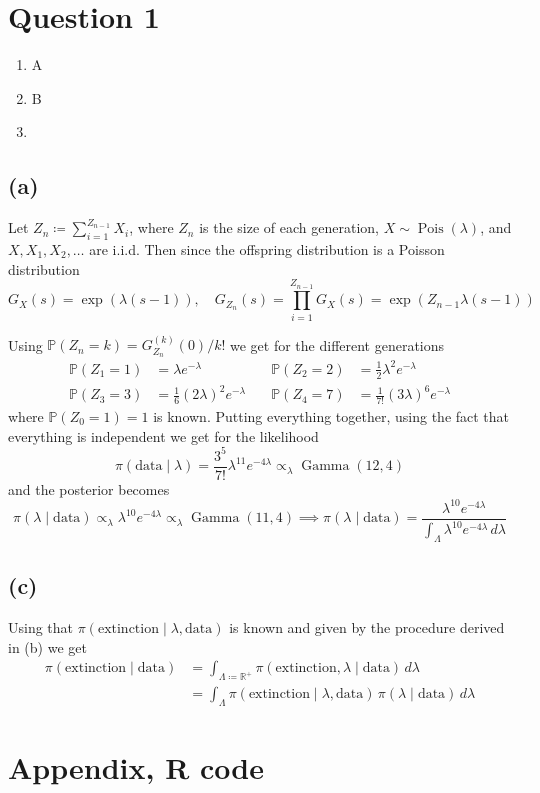 \documentclass{article}
\DeclareMathOperator\Poisson{Pois}
\DeclareMathOperator\GammaDist{Gamma}
\begin{document}
\section{Question 1}
\begin{enumerate}[label=(\alph*)]
\item A
\item B
\item
\end{enumerate}

\subsection{(a)}
Let $Z_n \coloneqq \sum_{i=1}^{Z_{n-1}} X_i$,
where $Z_n$ is the size of each generation,
$X \sim \Poisson(\lambda)$, and $X, X_1, X_2, \ldots$ are i.i.d.
Then since the offspring distribution is a Poisson distribution
$$ G_X(s) = \exp(\lambda (s - 1)), \quad
G_{Z_n}(s) = \prod_{i=1}^{Z_{n-1}} G_X(s) = \exp(Z_{n-1} \lambda (s - 1)) $$

Using $ \mathbb P(Z_n = k) = G_{Z_n}^{(k)}(0) / k! $
we get for the different generations
\begin{align*}
	\mathbb P(Z_1 = 1) &= \lambda e^{-\lambda} &\quad
	\mathbb P(Z_2 = 2) &= \frac12 \lambda^2 e^{-\lambda} \\
	\mathbb P(Z_3 = 3) &= \frac16 (2\lambda)^2 e^{-\lambda} &\quad
	\mathbb P(Z_4 = 7) &= \frac1{7!} (3\lambda)^6 e^{-\lambda}
\end{align*}
where $\mathbb P(Z_0 = 1) = 1$ is known.
Putting everything together,
using the fact that everything is independent we get for the likelihood
$$ \pi(\text{data} \mid \lambda) = \frac{3^5}{7!} \lambda^{11} e^{-4\lambda}
	\propto_\lambda \GammaDist(12, 4) $$
and the posterior becomes
$$ \pi(\lambda \mid \text{data}) \propto_\lambda \lambda^{10} e^{-4\lambda}
	\propto_\lambda \GammaDist(11, 4)
	\implies \pi(\lambda \mid \text{data}) = \frac{\lambda^{10} e^{-4\lambda}}{\int_\Lambda \lambda^10 e^{-4\lambda} \, d\lambda} $$

\subsection{(c)}
Using that $\pi(\text{extinction} \mid \lambda, \text{data})$ is known
and given by the procedure derived in (b) we get
\begin{align*}
\pi(\text{extinction} \mid \text{data}) &= \int_{\Lambda \coloneqq \mathbb R^+} \pi(\text{extinction}, \lambda \mid \text{data}) \, d\lambda \\
	&= \int_\Lambda \pi(\text{extinction} \mid \lambda, \text{data}) \, \pi(\lambda \mid \text{data}) \, d\lambda
\end{align*}

\appendix
\section{Appendix, R code}
% 
\end{document}
